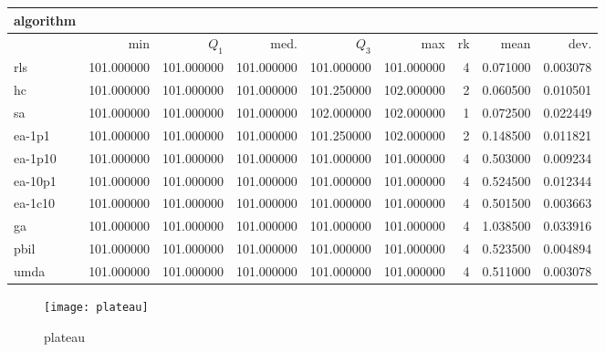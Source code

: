 \begin{center}
\begin{tabular}{@{}l*{5}{>{{}}N{3}{0}}>{{}}N{2}{0}N{1}{3}N{1}{3}@{}}
\toprule
{algorithm} &  &  \\
\midrule
& {min} & {$Q_1$} & {med.} & {$Q_3$} & {max} & {rk} & {mean} & {dev.} \\
\midrule
rls & {\color{blue}} 101.000000 & {\color{blue}} 101.000000 & {\color{blue}} 101.000000 & 101.000000 & 101.000000 & 4 & 0.071000 & 0.003078 \\
 hc & {\color{blue}} 101.000000 & {\color{blue}} 101.000000 & {\color{blue}} 101.000000 & 101.250000 & {\color{blue}} 102.000000 & 2 & 0.060500 & 0.010501 \\
 sa & {\color{blue}} 101.000000 & {\color{blue}} 101.000000 & {\color{blue}} 101.000000 & {\color{blue}} 102.000000 & {\color{blue}} 102.000000 & 1 & 0.072500 & 0.022449 \\
 ea-1p1 & {\color{blue}} 101.000000 & {\color{blue}} 101.000000 & {\color{blue}} 101.000000 & 101.250000 & {\color{blue}} 102.000000 & 2 & 0.148500 & 0.011821 \\
 ea-1p10 & {\color{blue}} 101.000000 & {\color{blue}} 101.000000 & {\color{blue}} 101.000000 & 101.000000 & 101.000000 & 4 & 0.503000 & 0.009234 \\
 ea-10p1 & {\color{blue}} 101.000000 & {\color{blue}} 101.000000 & {\color{blue}} 101.000000 & 101.000000 & 101.000000 & 4 & 0.524500 & 0.012344 \\
 ea-1c10 & {\color{blue}} 101.000000 & {\color{blue}} 101.000000 & {\color{blue}} 101.000000 & 101.000000 & 101.000000 & 4 & 0.501500 & 0.003663 \\
 ga & {\color{blue}} 101.000000 & {\color{blue}} 101.000000 & {\color{blue}} 101.000000 & 101.000000 & 101.000000 & 4 & 1.038500 & 0.033916 \\
 pbil & {\color{blue}} 101.000000 & {\color{blue}} 101.000000 & {\color{blue}} 101.000000 & 101.000000 & 101.000000 & 4 & 0.523500 & 0.004894 \\
 umda & {\color{blue}} 101.000000 & {\color{blue}} 101.000000 & {\color{blue}} 101.000000 & 101.000000 & 101.000000 & 4 & 0.511000 & 0.003078 \\
 \bottomrule
\end{tabular}
\end{center}

\begin{center}
\begin{figure}[h]
\centering
\texttt{[image: plateau]}
\caption{plateau}
\end{figure}
\end{center}

